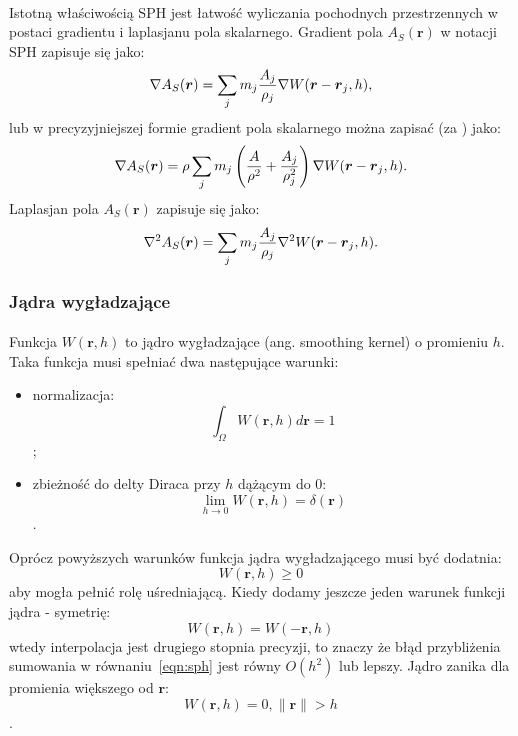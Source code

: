 \paragraph{}
Istotną właściwością SPH jest łatwość wyliczania pochodnych przestrzennych w postaci gradientu i laplasjanu pola skalarnego. Gradient pola $A_S(\boldsymbol{r})$ w notacji SPH zapisuje się jako:
\begin{equation}
\nabla A_S(\boldsymbol{r}) = \sum\limits_{j} m_j {A_j \over\rho_j} \nabla W(\boldsymbol{r}-\boldsymbol{r}_j, h),
\label{eqn:sph_grad}
\end{equation}
lub w precyzyjniejszej formie gradient pola skalarnego można zapisać (za \cite{kelager06}) jako:
\begin{equation}
\nabla A_S(\boldsymbol{r}) = \rho \sum\limits_{j} m_j \left( {A \over \rho^2} + {A_j \over \rho_j^2} \right) \nabla W(\boldsymbol{r}-\boldsymbol{r}_j, h).
\label{eqn:sph_grad_prec}
\end{equation}
Laplasjan pola $A_S(\boldsymbol{r})$ zapisuje się jako:
\begin{equation}
\nabla^2 A_S(\boldsymbol{r}) = \sum\limits_{j} m_j {A_j \over\rho_j} \nabla^2 W(\boldsymbol{r}-\boldsymbol{r}_j, h).
\label{eqn:sph_lap}
\end{equation}
\par

\subsubsection{Jądra wygładzające}

\paragraph{}
Funkcja $W(\boldsymbol{r}, h)$ to jądro wygładzające (ang. smoothing kernel) o promieniu $h$. Taka funkcja musi spełniać dwa następujące warunki:
\begin{itemize}
\item normalizacja: $$\int_{\Omega} W(\boldsymbol{r}, h) d\boldsymbol{r} = 1$$;
\item zbieżność do delty Diraca przy $h$ dążącym do 0: $$\lim_{h\to0} W(\boldsymbol{r}, h) = \delta(\boldsymbol{r})$$.
\end{itemize}
\vspace{3ex}
\noindent
Oprócz powyższych warunków funkcja jądra wygładzającego musi być dodatnia: $$W(\boldsymbol{r}, h) \ge 0$$ aby mogła pełnić rolę uśredniającą. Kiedy dodamy jeszcze jeden warunek funkcji jądra - symetrię: $$W(\boldsymbol{r}, h) = W(\boldsymbol{-r}, h)$$ wtedy interpolacja jest drugiego stopnia precyzji, to znaczy że błąd przybliżenia sumowania w równaniu~\eqref{eqn:sph} jest równy $O(h^{2})$ lub lepszy. Jądro zanika dla promienia większego od $\boldsymbol{r}$: $$W(\boldsymbol{r}, h) = 0, \| \mathbf{r} \| > h$$.
\par

